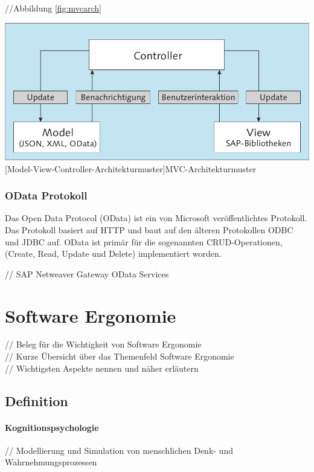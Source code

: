 \documentclass[12pt,a4paper,bibliography=totocnumbered,listof=totocnumbered]{scrartcl}
\begin{document}
//Abbildung \ref{fig:mvcarch}\\
	\vspace{1em}
	\begin{minipage}{\linewidth}
		\centering
		\includegraphics[width=0.7\linewidth]{images/mvc_arch2.png}
		[Model-View-Controller-Architekturmuster]{MVC-Architekturmuster\cite[S.124]{AntoEinf2014}}
		\label{fig:mvcarch}
	\end{minipage}

\subsubsection{OData Protokoll}
\glqq Das Open Data Protocol (OData) ist ein von Microsoft veröffentlichtes Protokoll. Das Protokoll basiert auf HTTP und baut auf den älteren Protokollen \ac{ODBC} und \ac{JDBC} auf. OData ist primär für die sogenannten CRUD-Operationen, (Create, Read, Update und Delete) implementiert worden.\grqq{}\cite[S.168]{AntoEinf2014}

// SAP Netweaver Gateway OData Services\\
\pagebreak

\section{Software Ergonomie}
// Beleg für die Wichtigkeit von Software Ergonomie\\
// Kurze Übersicht über das Themenfeld Software Ergonomie\\
// Wichtigsten Aspekte nennen und näher erläutern\\

\subsection{Definition}
\paragraph{Kognitionspsychologie}
// Modellierung und Simulation von menschlichen Denk- und Wahrnehmungsprozessen\\
\end{document}
